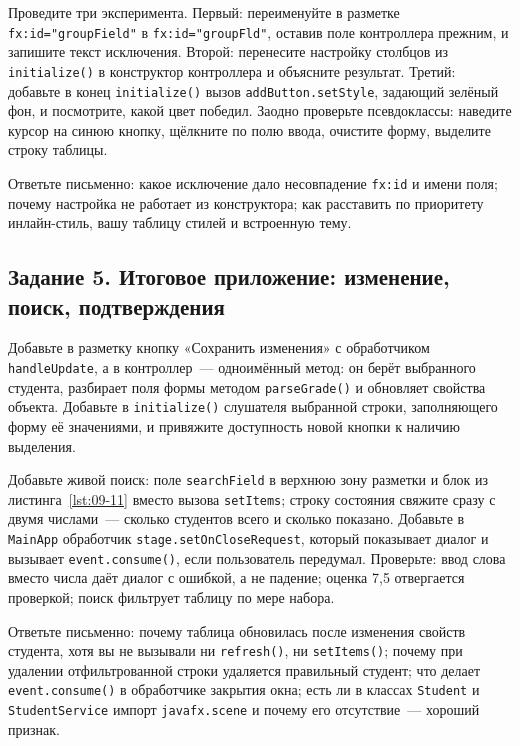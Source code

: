Проведите три эксперимента. Первый: переименуйте в разметке
\texttt{fx:id="groupField"} в \texttt{fx:id="groupFld"}, оставив поле
контроллера прежним, и запишите текст исключения. Второй: перенесите настройку
столбцов из \texttt{initialize()} в конструктор контроллера и объясните
результат. Третий: добавьте в конец \texttt{initialize()} вызов
\texttt{addButton.setStyle}, задающий зелёный фон, и посмотрите, какой цвет
победил. Заодно проверьте псевдоклассы: наведите курсор на синюю кнопку,
щёлкните по полю ввода, очистите форму, выделите строку таблицы.

Ответьте письменно: какое исключение дало несовпадение \texttt{fx:id} и имени
поля; почему настройка не работает из конструктора; как расставить по приоритету
инлайн-стиль, вашу таблицу стилей и встроенную тему.

\subsection*{Задание 5. Итоговое приложение: изменение, поиск, подтверждения}

Добавьте в разметку кнопку «Сохранить изменения» с обработчиком
\texttt{handleUpdate}, а в контроллер~--- одноимённый метод: он берёт выбранного
студента, разбирает поля формы методом \texttt{parseGrade()} и обновляет
свойства объекта. Добавьте в \texttt{initialize()} слушателя выбранной строки,
заполняющего форму её значениями, и привяжите доступность новой кнопки к наличию
выделения.

Добавьте живой поиск: поле \texttt{searchField} в верхнюю зону разметки и блок
из листинга~\ref{lst:09-11} вместо вызова \texttt{setItems}; строку состояния
свяжите сразу с двумя числами~--- сколько студентов всего и сколько показано.
Добавьте в \texttt{MainApp} обработчик \texttt{stage.setOnCloseRequest}, который
показывает диалог и вызывает \texttt{event.consume()}, если пользователь
передумал. Проверьте: ввод слова вместо числа даёт диалог с ошибкой, а не
падение; оценка 7,5 отвергается проверкой; поиск фильтрует таблицу по мере
набора.

Ответьте письменно: почему таблица обновилась после изменения свойств студента,
хотя вы не вызывали ни \texttt{refresh()}, ни \texttt{setItems()}; почему при
удалении отфильтрованной строки удаляется правильный студент; что делает
\texttt{event.consume()} в обработчике закрытия окна; есть ли в классах
\texttt{Student} и \texttt{StudentService} импорт \texttt{javafx.scene} и почему
его отсутствие~--- хороший признак.


